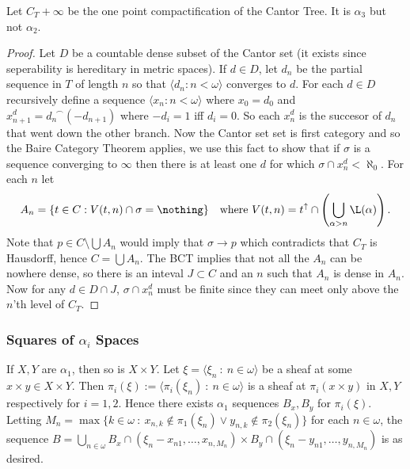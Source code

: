 \documentclass{article}
\begin{document}
\begin{prop}
    Let \(C_T + \infty\) be the one point compactification of the Cantor Tree. It is \(\alpha_3\) but not \(\alpha_2\).
\end{prop}
\begin{proof}
    Let \(D\) be a countable dense subset of the Cantor set (it exists since seperability is hereditary in metric spaces). If \(d \in D\), let \(d_n\) be the partial sequence in \(T\) of length \(n\) so that \(\langle d_n: n < \omega\rangle\) converges to \(d\). For each \(d \in D\) recursively define a sequence \(\langle x_n : n < \omega\rangle\) where \(x_0 = d_0\) and \(x_{n + 1}^d = d_n^{\,\,\,\frown}(-d_{n + 1})\) where \(-d_i = 1\) iff \(d_i = 0\). So each \(x_n^d\) is the succesor of \(d_n\) that went down the other branch. Now the Cantor set set is first category and so the Baire Category Theorem applies, we use this fact to show that if \(\sigma\) is a sequence converging to \(\infty\) then there is at least one \(d\) for which \(\sigma \cap x_n^d < \aleph_0\). For each \(n\) let
    \[
        A_n = \{t \in C: V(t, n)\cap\sigma = \nothing\} \quad \text{where } V(t, n) = t^{\uparrow}\cap \left(\bigcup_{\alpha > n} \L(\alpha)\right). 
    \]
    Note that \(p \in C \setminus \bigcup A_n\) would imply that \(\sigma \to p\) which contradicts that \(C_T\) is Hausdorff, hence \(C = \bigcup A_n\). The BCT implies that not all the \(A_n\) can be nowhere dense, so there is an inteval \(J \subset C\) and an \(n\) such that \(A_n\) is dense in \(A_n\). Now for any \(d \in D\cap J\), \(\sigma \cap x_n^d\) must be finite since they can meet only above the \(n\)'th level of \(C_T\).


\end{proof}

\subsubsection{Squares of \(\alpha_i\) Spaces} 
\begin{exam}
    If \(X, Y\) are \(\alpha_1\), then so is \(X \times Y\). Let \(\xi = \langle \xi_n \: : \: n \in \omega \rangle \) be a  sheaf at some \(x\times y \in X \times Y\). Then \(\pi_i(\xi) := \langle \pi_i(\xi_n) \: : \: n \in \omega\rangle\) is a sheaf at \(\pi_i(x\times y)\) in \(X, Y\) respectively for \(i = 1, 2\). Hence there exists \(\alpha_1\) sequences \(B_x, B_y\) for \(\pi_i(\xi)\). Letting \(M_n = \max\{k \in \omega \: : \: x_{n,k} \not \in \pi_1(\xi_n) \vee y_{n,k} \not \in \pi_2(\xi_n)\} \) for each \(n \in \omega\), the sequence \(B = \bigcup_{n \in \omega}B_x \cap (\xi_n- {x_{n1}, \dots, x_{n, M_n}}) \times B_y \cap (\xi_n- {y_{n1}, \dots, y_{n, M_n}})\) is as desired.
\end{exam}
\end{document}
